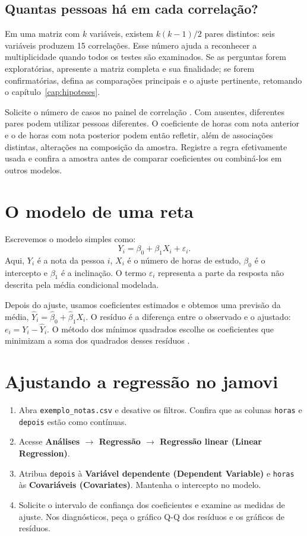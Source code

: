 \subsection{Quantas pessoas há em cada correlação?}

Em uma matriz com $k$ variáveis, existem $k(k-1)/2$ pares distintos: seis variáveis produzem 15 correlações. Esse número ajuda a reconhecer a multiplicidade quando todos os testes são examinados. Se as perguntas forem exploratórias, apresente a matriz completa e sua finalidade; se forem confirmatórias, defina as comparações principais e o ajuste pertinente, retomando o capítulo~\ref{cap:hipoteses}.

Solicite o número de casos no painel de correlação \parencite{JamoviCorrelacao}. Com ausentes, diferentes pares podem utilizar pessoas diferentes. O coeficiente de horas com nota anterior e o de horas com nota posterior podem então refletir, além de associações distintas, alterações na composição da amostra. Registre a regra efetivamente usada e confira a amostra antes de comparar coeficientes ou combiná-los em outros modelos.

\section{O modelo de uma reta}

Escrevemos o modelo simples como:
\[
Y_i=\beta_0+\beta_1X_i+\varepsilon_i.
\]
Aqui, $Y_i$ é a nota da pessoa $i$, $X_i$ é o número de horas de estudo, $\beta_0$ é o intercepto e $\beta_1$ é a inclinação. O termo $\varepsilon_i$ representa a parte da resposta não descrita pela média condicional modelada.

Depois do ajuste, usamos coeficientes estimados e obtemos uma previsão da média, $\widehat{Y}_i=\widehat{\beta}_0+\widehat{\beta}_1X_i$. O resíduo é a diferença entre o observado e o ajustado: $e_i=Y_i-\widehat{Y}_i$. O método dos mínimos quadrados escolhe os coeficientes que minimizam a soma dos quadrados desses resíduos \parencite{NISTRegressao}.

\section{Ajustando a regressão no jamovi}

\begin{enumerate}
  \item Abra \texttt{exemplo\_notas.csv} e desative os filtros. Confira que as colunas \texttt{horas} e \texttt{depois} estão como contínuas.
  \item Acesse \textbf{Análises $\rightarrow$ Regressão $\rightarrow$ Regressão linear (Linear Regression)}.
  \item Atribua \texttt{depois} à \textbf{Variável dependente (Dependent Variable)} e \texttt{horas} às \textbf{Covariáveis (Covariates)}. Mantenha o intercepto no modelo.
  \item Solicite o intervalo de confiança dos coeficientes e examine as medidas de ajuste. Nos diagnósticos, peça o gráfico Q-Q dos resíduos e os gráficos de resíduos.
\end{enumerate}

